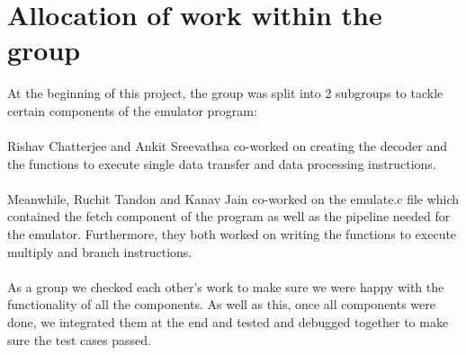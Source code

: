 \documentclass[a4paper]{article}
\begin{document}
\section{Allocation of work within the group}
At the beginning of this project, the group was split into 2 subgroups to tackle certain components of the emulator program:\\ \\
Rishav Chatterjee and Ankit Sreevathsa co-worked on creating the decoder and the functions to execute single data transfer and data processing instructions.
\\\\
Meanwhile, Ruchit Tandon and Kanav Jain co-worked on the emulate.c file which contained the fetch component of the program as well as the pipeline needed for the emulator. Furthermore, they both worked on writing the functions to execute multiply and branch instructions. 
\\\\
As a group we checked each other's work to make sure we were happy with the functionality of all the components. As well as this, once all components were done, we integrated them at the end and tested and debugged together to make sure the test cases passed. 
\end{document}
